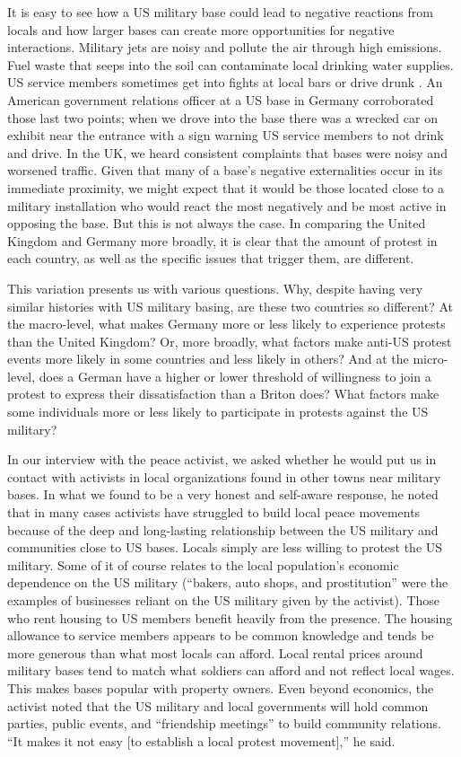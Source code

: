 It is easy to see how a US military base could lead to negative reactions from locals and how larger bases can create more opportunities for negative interactions. Military jets are noisy and pollute the air through high emissions. Fuel waste that seeps into the soil can contaminate local drinking water supplies. US service members sometimes get into fights at local bars or drive drunk \cite{kasernetwo20190725}. An American government relations officer at a US base in Germany corroborated those last two points; when we drove into the base there was a wrecked car on exhibit near the entrance with a sign warning US service members to not drink and drive. In the UK, we heard consistent complaints that bases were noisy and worsened traffic. Given that many of a base's negative externalities occur in its immediate proximity, we might expect that it would be those located close to a military installation who would react the most negatively and be most active in opposing the base. But this is not always the case. In comparing the United Kingdom and Germany more broadly, it is clear that the amount of protest in each country, as well as the specific issues that trigger them, are different. 

This variation presents us with various questions. Why, despite having very similar histories with US military basing, are these two countries so different? At the macro-level, what makes Germany more or less likely to experience protests than the United Kingdom? Or, more broadly, what factors make anti-US protest events more likely in some countries and less likely in others? And at the micro-level, does a German have a higher or lower threshold of willingness to join a protest to express their dissatisfaction than a Briton does? What factors make some individuals more or less likely to participate in protests against the US military?

In our interview with the peace activist, we asked whether he would put us in contact with activists in local organizations found in other towns near military bases. In what we found to be a very honest and self-aware response, he noted that in many cases activists have struggled to build local peace movements because of the deep and long-lasting relationship between the US military and communities close to US bases. Locals simply are less willing to protest the US military. Some of it of course relates to the local population's economic dependence on the US military (``bakers, auto shops, and prostitution'' were the examples of businesses reliant on the US military given by the activist). Those who rent housing to US members benefit heavily from the presence. The housing allowance to service members appears to be common knowledge and tends be more generous than what most locals can afford. Local rental prices around military bases tend to match what soldiers can afford and not reflect local wages. This makes bases popular with property owners. Even beyond economics, the activist noted that the US military and local governments will hold common parties, public events, and ``friendship meetings'' to build community relations. ``It makes it not easy [to establish a local protest movement],'' he said. 

